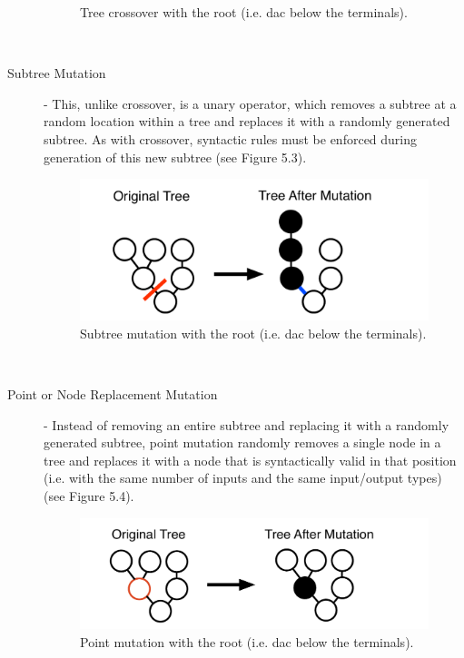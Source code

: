 \documentclass[a4paper,12pt]{report} 	%
\numberwithin{figure}{chapter}
\numberwithin{table}{chapter}
\numberwithin{equation}{chapter}
\begin{document}
\begin{flushleft}
\begin{description}
\begin{figure}[h!]
\begin{center}
\caption[Crossover]{Tree crossover with the root (i.e. dac\texttildelow{} below the terminals).}
\end{center}
\end{figure}
\\
\item[Subtree Mutation] - This, unlike crossover, is a unary operator, which removes a subtree at a random location within a tree and replaces it with a randomly generated subtree. As with crossover, syntactic rules must be enforced during generation of this new subtree (see Figure 5.3).
\begin{figure}[h!]
\begin{center}
\includegraphics[scale=0.5]{SubtreeMutation}
\caption[Subtree Mutation]{Subtree mutation with the root (i.e. dac\texttildelow{} below the terminals).}
\end{center}
\end{figure}
\\
\item[Point or Node Replacement Mutation] - Instead of removing an entire subtree and replacing it with a randomly generated subtree, point mutation randomly removes a single node in a tree and replaces it with a node that is syntactically valid in that position (i.e. with the same number of inputs and the same input/output types) (see Figure 5.4).
\begin{figure}[h!]
\begin{center}
\includegraphics[scale=0.5]{PointMutation}
\caption[Point Mutation]{Point mutation with the root (i.e. dac\texttildelow{} below the terminals).}

\end{center}
\end{figure}
\end{description}
\end{flushleft}
\end{document}
